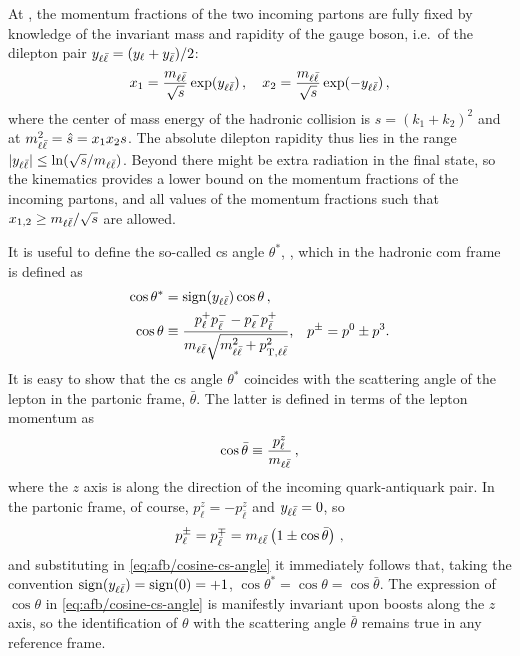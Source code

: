 At \lo, the momentum fractions of the two incoming partons are fully
fixed by knowledge of the invariant mass and rapidity of the gauge
boson, i.e.\ of the dilepton pair  $y_{\ell\bar{\ell}} = (y_\ell + y_{\bar{\ell}})/2$: 
\begin{equation}
  \label{eq:afb/x_fractions}
  x_1 = \frac{ m_{\ell\bar{\ell}}}{\sqrt{s}}\exp(y_{\ell\bar{\ell}}) \, ,\quad x_2 = \frac{
  m_{\ell\bar{\ell}}}{\sqrt{s}}\exp(-y_{\ell\bar{\ell}}) \, ,
\end{equation}
where the center of mass energy of the hadronic collision is
$s=(k_1+k_2)^2$ and at \lo
$m_{\ell\bar{\ell}}^2 = \hat s = x_1 x_2 s$. The absolute dilepton
rapidity thus lies in the range $|y_{\ell\bar{\ell}}|\le \ln (\sqrt{s}/m_{\ell\bar{\ell}})$.
Beyond \lo there might be extra radiation in the final state, so the \lo
kinematics provides a lower bound on the momentum fractions of the
incoming partons, and all values of the momentum
fractions such that $x_{1,2}\ge m_{\ell\bar{\ell}}/\sqrt s$ are allowed.

It is useful to define the so-called  \acrlong{cs} angle $\theta^*$,
\cite{Collins:1977iv}, which in the hadronic \acrfull{com} frame is defined as
\begin{equation}
\begin{split}
  \cos\theta^* &= \operatorname{sign} (y_{\ell\bar{\ell}}) \cos\theta \, ,\\
  \cos\theta &\equiv\frac{p_\ell^+ p_{\bar{\ell}}^- - p_\ell^- p_{\bar{\ell}}^+}{m_{\ell\bar{\ell}} \sqrt{m_{\ell\bar{\ell}}^2 + p_{\mathrm{T},\ell\bar{\ell}}^2}} \text{,} \quad p^\pm = p^0 \pm p^3 \text{.}
  \label{eq:afb/cosine-cs-angle}
\end{split}
\end{equation}
It is easy to show that the \acrlong{cs} angle $\theta^*$ coincides with the
scattering angle of the lepton in the partonic \com frame, $\bar\theta$.
%
The latter is defined in terms of the lepton momentum as 
\begin{equation}
 \cos\bar\theta \equiv \frac{p^z_\ell}{m_{\ell\bar{\ell}}} \,, \label{eq:afb/coscm}
\end{equation}
where the $z$ axis is along the direction of the incoming quark-antiquark pair.
%
In the partonic \com frame, of course, $p^z_\ell=-p^z_{\bar \ell}$ and $y_{\ell\bar{\ell}}
=0$, so
\begin{equation}
p^\pm_\ell=p^{\mp}_{\bar{\ell}}=  m_{\ell\bar{\ell}} \left( 1\pm \cos{\bar\theta} \right)\, ,
\end{equation}
and substituting in \cref{eq:afb/cosine-cs-angle} it immediately follows that,
taking the convention 
$\operatorname{sign} (y_{\ell\bar{\ell}})=\operatorname{sign}(0)=+1$, 
$\cos\theta^*=\cos\theta=\cos{\bar\theta}$.
%
The expression of $\cos\theta$ in \cref{eq:afb/cosine-cs-angle} is manifestly
invariant upon boosts along the $z$ axis, so the identification of $\theta$
with the \com scattering angle $\bar\theta$ remains true in any reference
frame.

